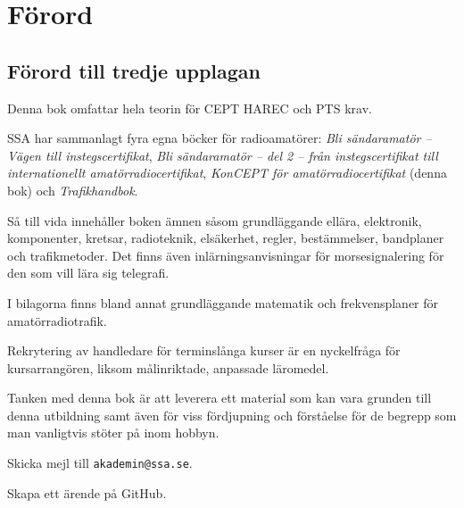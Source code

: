 \chapter*{Förord}

\balance

\section*{Förord till tredje upplagan}

Denna bok omfattar hela teorin för CEPT HAREC och PTS krav.

SSA har sammanlagt fyra egna böcker för radioamatörer:
\emph{Bli sändaramatör -- Vägen till instegscertifikat},
\emph{Bli sändaramatör -- del 2 -- från
instegscertifikat till internationellt
amatörradiocertifikat},
\emph{KonCEPT för amatörradiocertifikat} (denna bok) och
\emph{Trafikhandbok}.

Så till vida innehåller boken ämnen såsom grundläggande ellära, elektronik,
komponenter, kretsar, radioteknik, elsäkerhet, regler, bestämmelser, bandplaner
och trafikmetoder.
Det finns även inlärningsanvisningar för morsesignalering för den som vill lära
sig telegrafi.

I bilagorna finns bland annat grundläggande matematik och frekvensplaner för
amatörradiotrafik.

Rekrytering av handledare för terminslånga kurser är en nyckelfråga för
kursarrangören, liksom målinriktade, anpassade läromedel.

Tanken med denna bok är att leverera ett material som kan vara grunden till
denna utbildning samt även för viss fördjupning och förståelse för de begrepp
som man vanligtvis stöter på inom hobbyn.

\bigskip

\begin{tcolorbox}[sidebyside,colback=white,title=Två sätt att lämna återkoppling]
\begin{center}
\end{center}

Skicka mejl till \texttt{akademin@ssa.se}.
\tcblower
\begin{center}
\end{center}

Skapa ett ärende på GitHub.
\end{tcolorbox}
